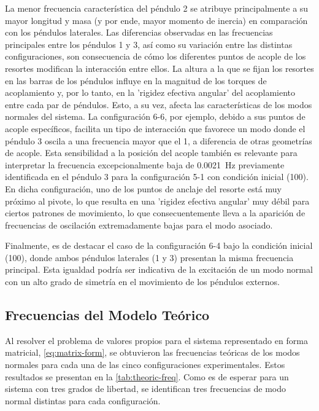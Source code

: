 La menor frecuencia caracter\'istica del p\'endulo 2 se atribuye
principalmente a su mayor longitud y masa (y por ende, mayor momento
de inercia) en comparaci\'on con los p\'endulos laterales. Las
diferencias observadas en las frecuencias principales entre los
p\'endulos 1 y 3, as\'i como su variaci\'on entre las distintas
configuraciones, son consecuencia de c\'omo los diferentes puntos de
acople de los resortes modifican la interacci\'on entre ellos. La
altura a la que se fijan los resortes en las barras de los
p\'endulos influye en la magnitud de los torques de acoplamiento y,
por lo tanto, en la 'rigidez efectiva angular' del acoplamiento
entre cada par de p\'endulos. Esto, a su vez, afecta las
caracter\'isticas de los modos normales del sistema. La
configuraci\'on 6-6, por ejemplo, debido a sus puntos de acople
espec\'ificos, facilita un tipo de interacci\'on que
favorece un modo donde el p\'endulo 3 oscila a una frecuencia mayor
que el 1, a diferencia de otras geometr\'ias de acople.
Esta sensibilidad a la posici\'on del acople tambi\'en es relevante
para interpretar la frecuencia excepcionalmente baja de
\qty{0.0021}{\Hz} previamente identificada en el p\'endulo 3 para la
configuraci\'on 5-1 con condici\'on inicial (100). En dicha
configuraci\'on, uno de los puntos de anclaje del resorte est\'a
muy pr\'oximo al pivote, lo que resulta en una 'rigidez efectiva
angular' muy d\'ebil para ciertos patrones de movimiento, lo que
consecuentemente lleva a la aparici\'on de frecuencias de
oscilaci\'on extremadamente bajas para el modo asociado.

Finalmente, es de destacar el caso de la configuraci\'on 6-4 bajo la
condici\'on inicial (100), donde ambos p\'endulos laterales (1 y 3)
presentan la misma frecuencia principal. Esta igualdad podr\'ia ser
indicativa de la excitaci\'on de un modo normal con un alto grado de
simetr\'ia en el movimiento de los p\'endulos externos.

\subsection*{Frecuencias del Modelo Teórico}

Al resolver el problema de valores propios para el sistema representado
en forma matricial, \cref{eq:matrix-form}, se obtuvieron las
frecuencias te\'oricas de los modos normales para cada una de las
cinco configuraciones experimentales. Estos resultados se presentan
en la \cref{tab:theoric-freq}. Como es de esperar para un sistema
con tres grados de libertad, se identifican tres frecuencias de modo
normal distintas para cada configuraci\'on.

